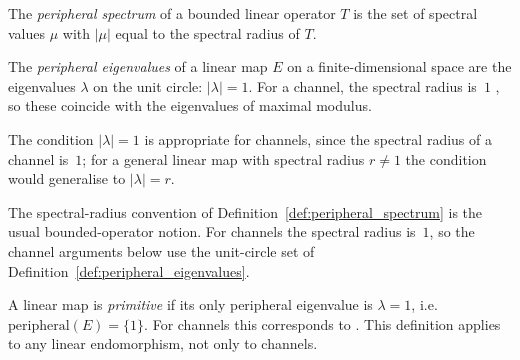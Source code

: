 \begin{definition}\label{def:peripheral_spectrum}
    \leanok
    The \emph{peripheral spectrum} of a bounded linear operator $T$
    is the set of spectral values $\mu$ with
    $|\mu|$ equal to the spectral radius of $T$.
\end{definition}

\begin{definition}\label{def:peripheral_eigenvalues}
    \leanok
    The \emph{peripheral eigenvalues} of a linear map $E$ on
    a finite-dimensional space
    are the eigenvalues $\lambda$ on the unit circle:
    $|\lambda| = 1$.
    For a channel, the spectral radius is~$1$
    \cite[Proposition~6.1]{Wolf2012Quantum}, so these coincide with
    the eigenvalues of maximal modulus.

    The condition $|\lambda| = 1$ is appropriate for channels, since the
    spectral radius of a channel is~$1$; for a general linear map with
    spectral radius $r \neq 1$ the condition would generalise to
    $|\lambda| = r$.
\end{definition}

\begin{remark}%
    \label{rem:peripheral_conventions_channels}
    \leanok
    The spectral-radius convention of
    Definition~\ref{def:peripheral_spectrum} is the usual bounded-operator
    notion. For channels the spectral radius is~$1$, so the channel arguments
    below use the unit-circle set of Definition~\ref{def:peripheral_eigenvalues}.
\end{remark}

\begin{definition}\label{def:primitive_channel}
    \leanok
    A linear map is \emph{primitive} if its only peripheral eigenvalue
    is $\lambda = 1$, i.e.\
    $\mathrm{peripheral}(E) = \{1\}$.
    For channels this corresponds to \cite[Theorem~6.7]{Wolf2012Quantum}.
    This definition applies to any linear endomorphism, not only
    to channels.
\end{definition}
